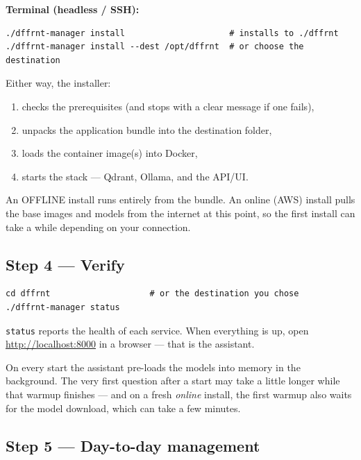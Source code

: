 \documentclass[11pt,letterpaper]{article}
\begin{document}
\textbf{Terminal (headless / SSH):}

\begin{lstlisting}
./dffrnt-manager install                     # installs to ./dffrnt
./dffrnt-manager install --dest /opt/dffrnt  # or choose the destination
\end{lstlisting}

Either way, the installer:

\begin{enumerate}
  \item checks the prerequisites (and stops with a clear message if one
        fails),
  \item unpacks the application bundle into the destination folder,
  \item loads the container image(s) into Docker,
  \item starts the stack --- Qdrant, Ollama, and the API/UI.
\end{enumerate}

An OFFLINE install runs entirely from the bundle. An online (AWS) install
pulls the base images and models from the internet at this point, so the
first install can take a while depending on your connection.

\subsection{Step 4 --- Verify}

\begin{lstlisting}
cd dffrnt                    # or the destination you chose
./dffrnt-manager status
\end{lstlisting}

\texttt{status} reports the health of each service. When everything is up,
open \url{http://localhost:8000} in a browser --- that is the assistant.

\begin{gnote}
On every start the assistant pre-loads the models into memory in the
background. The very first question after a start may take a little longer
while that warmup finishes --- and on a fresh \emph{online} install, the first
warmup also waits for the model download, which can take a few minutes.
\end{gnote}

\subsection{Step 5 --- Day-to-day management}
\label{sec:daytoday}
\end{document}
